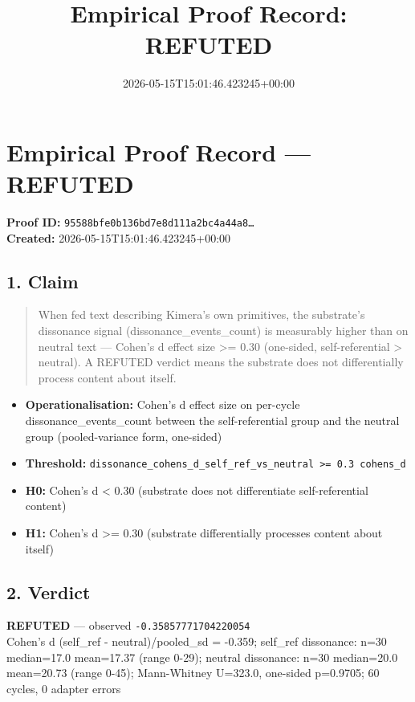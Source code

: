 \documentclass{article}
\title{Empirical Proof Record: REFUTED}
\date{2026-05-15T15:01:46.423245+00:00}
\begin{document}
\maketitle
\section*{Empirical Proof Record --- \textcolor{refuted}{\textbf{REFUTED}}}
\textbf{Proof ID:} \texttt{95588bfe0b136bd7e8d111a2bc4a44a8\dots}\\
\textbf{Created:} 2026-05-15T15:01:46.423245+00:00
\subsection*{1. Claim}
\begin{quote}When fed text describing Kimera's own primitives, the substrate's dissonance signal (dissonance\_events\_count) is measurably higher than on neutral text — Cohen's d effect size >= 0.30 (one-sided, self-referential > neutral). A REFUTED verdict means the substrate does not differentially process content about itself.\end{quote}
\begin{itemize}
\item \textbf{Operationalisation:} Cohen's d effect size on per-cycle dissonance\_events\_count between the self-referential group and the neutral group (pooled-variance form, one-sided)
\item \textbf{Threshold:} \texttt{dissonance\_cohens\_d\_self\_ref\_vs\_neutral >= 0.3 cohens\_d}
\item \textbf{H0:} Cohen's d < 0.30 (substrate does not differentiate self-referential content)
\item \textbf{H1:} Cohen's d >= 0.30 (substrate differentially processes content about itself)
\end{itemize}
\subsection*{2. Verdict}
\textcolor{refuted}{\textbf{REFUTED}} --- observed \texttt{-0.35857771704220054}\\
Cohen's d (self\_ref - neutral)/pooled\_sd = -0.359; self\_ref dissonance: n=30 median=17.0 mean=17.37 (range 0-29); neutral dissonance: n=30 median=20.0 mean=20.73 (range 0-45); Mann-Whitney U=323.0, one-sided p=0.9705; 60 cycles, 0 adapter errors
\end{document}
